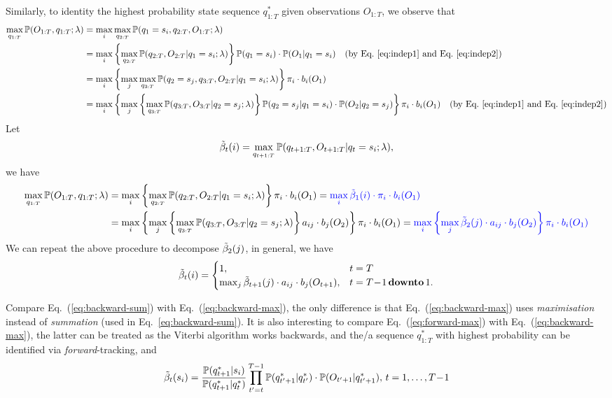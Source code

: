 Similarly, to identity the highest probability state sequence $q_{1:T}^*$ given observations $O_{1:T}$, 
we observe that 
\begin{align*}
\max_{q_{1:T}} \mathbb{P}(O_{1:T}, q_{1:T} ;\lambda) 
&= \max_{i} \max_{q_{2:T}} \mathbb{P}(q_1 = s_i, q_{2:T}, O_{1:T} ;\lambda) \\
&= \max_{i} \left\{ \max_{q_{2:T}} \mathbb{P}(q_{2:T}, O_{2:T} |q_1 = s_i; \lambda) \right\} \mathbb{P}(q_1 = s_i) \cdot \mathbb{P}(O_1 |q_1 = s_i) 
   ~~~ \text{(by Eq.~\ref{eq:indep1} and Eq.~\ref{eq:indep2})} \\
&= \max_{i} \left\{ \max_{j} \max_{q_{3:T}} \mathbb{P}(q_2 = s_j, q_{3:T}, O_{2:T} |q_1 = s_i; \lambda) \right\} \pi_i \cdot b_i(O_1) \\
&= \max_{i} \left\{ \max_{j} \left\{ \max_{q_{3:T}} \mathbb{P}(q_{3:T}, O_{3:T} |q_2 = s_j; \lambda) \right\} \mathbb{P}(q_2 = s_j |q_1 = s_i) \cdot \mathbb{P}(O_2 |q_2 = s_j) 
   \right\} \pi_i \cdot b_i(O_1) 
   ~~~ \text{(by Eq.~\ref{eq:indep1} and Eq.~\ref{eq:indep2})}
\end{align*}
Let 
\begin{equation}
\label{eq:betat}
\tilde{\beta}_t(i) = \max_{q_{t+1:T}} \mathbb{P}(q_{t+1:T}, O_{t+1:T} |q_t = s_i; \lambda),
\end{equation}
we have
\begin{alignat}{2}
\max_{q_{1:T}} \mathbb{P}(O_{1:T}, q_{1:T} ;\lambda) 
&= \max_{i} \left\{ \max_{q_{2:T}} \mathbb{P}(q_{2:T}, O_{2:T} |q_1 = s_i; \lambda) \right\} \pi_i \cdot b_i(O_1) 
 = {\color{blue}{\max_{i} \tilde{\beta}_1(i) \cdot \pi_i \cdot b_i(O_1)}}  \label{eq:max-backward}\\
&= \max_{i} \left\{ \max_{j} \left\{ \max_{q_{3:T}} \mathbb{P}(q_{3:T}, O_{3:T} |q_2 = s_j; \lambda) \right\} a_{ij} \cdot b_j(O_2) \right\} \pi_i \cdot b_i(O_1) 
 = {\color{blue}{\max_{i} \left\{ \max_{j} \tilde{\beta}_2(j) \cdot a_{ij} \cdot b_j(O_2) \right\} \pi_i \cdot b_i(O_1)}}  \nonumber
\end{alignat}
We can repeat the above procedure to decompose $\tilde{\beta}_2(j)$, in general, we have
\begin{equation}
\label{eq:backward-max}
\tilde{\beta}_t(i) = \begin{cases}
              1, & t=T \\
              \max_{j} \tilde{\beta}_{t+1}(j) \cdot a_{ij} \cdot b_j(O_{t+1}), & t=T\!-\!1 \,\textbf{downto}\, 1.
             \end{cases}
\end{equation}

Compare Eq.~(\ref{eq:backward-sum}) with Eq.~(\ref{eq:backward-max}), 
the only difference is that Eq.~(\ref{eq:backward-max}) uses \emph{maximisation} instead of \emph{summation} (used in Eq.~\ref{eq:backward-sum}).
It is also interesting to compare Eq.~(\ref{eq:forward-max}) with Eq.~(\ref{eq:backward-max}), 
the latter can be treated as the Viterbi algorithm works backwards, 
and the/a sequence $q_{1:T}^*$ with highest probability can be identified via \emph{forward}-tracking, and
\begin{equation}
\label{eq:beta-sum}
\tilde{\beta}_t(s_i) = \frac{\mathbb{P}(q_{t+1}^* |s_i)} {\mathbb{P}(q_{t+1}^* |q_t^*)} \prod_{t'=t}^{T-1} \mathbb{P}(q_{t'+1}^* |q_{t'}^*) \cdot \mathbb{P}(O_{t'+1} |q_{t'+1}^*), \, t = 1,\dots,T\!-\!1
\end{equation}


